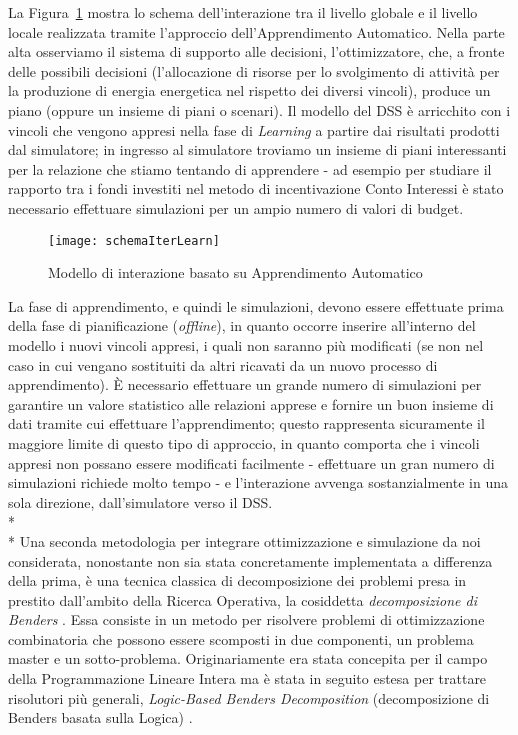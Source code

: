 \documentclass[12pt,a4paper,openright,twoside]{report}
\begin{document}
La Figura~\ref{schemaIterLearn} mostra lo schema dell'interazione tra il livello globale e il livello locale realizzata tramite l'approccio dell'Apprendimento Automatico. Nella parte alta osserviamo il sistema di supporto alle decisioni, l'ottimizzatore, che, a fronte delle possibili decisioni (l'allocazione di risorse per lo svolgimento di attività per la produzione di energia energetica nel rispetto dei diversi vincoli), produce un piano (oppure un insieme di piani o scenari). Il modello del DSS è arricchito con i vincoli che vengono appresi nella fase di \emph{Learning} a partire dai risultati prodotti dal simulatore; in ingresso al simulatore troviamo un insieme di piani interessanti per la relazione che stiamo tentando di apprendere - ad esempio per studiare il rapporto tra i fondi investiti nel metodo di incentivazione Conto Interessi è stato necessario effettuare simulazioni per un ampio numero di valori di budget. 
\begin{figure}[htb]
	\begin{center}
	\texttt{[image: schemaIterLearn]}
	\end{center}
	\caption{Modello di interazione basato su Apprendimento Automatico}
  	\label{schemaIterLearn}
\end{figure}

La fase di apprendimento, e quindi le simulazioni, devono essere effettuate prima della fase di pianificazione (\emph{offline}), in quanto occorre inserire all'interno del modello i nuovi vincoli appresi, i quali non saranno più modificati (se non nel caso in cui vengano sostituiti da altri ricavati da un nuovo processo di apprendimento). \`E necessario effettuare un grande numero di simulazioni per garantire un valore statistico alle relazioni apprese e fornire un buon insieme di dati tramite cui effettuare l'apprendimento; questo rappresenta sicuramente il maggiore limite di questo tipo di approccio, in quanto comporta che i vincoli appresi non possano essere modificati facilmente - effettuare un gran numero di simulazioni richiede molto tempo - e l'interazione avvenga sostanzialmente in una sola direzione, dall'simulatore verso il DSS. 
\\*\\*
Una seconda metodologia per integrare ottimizzazione e simulazione da noi considerata, nonostante non sia stata concretamente implementata a differenza della prima, è una tecnica classica di decomposizione dei problemi presa in prestito dall'ambito della Ricerca Operativa, la cosiddetta \emph{decomposizione di Benders} \cite{bendersDec}. Essa consiste in un metodo per risolvere problemi di ottimizzazione combinatoria che possono essere scomposti in due componenti, un problema master e un sotto-problema. Originariamente era stata concepita per il campo della Programmazione Lineare Intera ma è stata in seguito estesa per trattare risolutori più generali, \emph{Logic-Based Benders Decomposition} (decomposizione di Benders basata sulla Logica) \cite{Hooker95logic-basedbenders}. 
\end{document}
